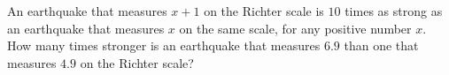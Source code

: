 An earthquake that measures $x+1$ on the Richter scale is $10$ times as strong as an earthquake that measures $x$ on the same scale, for any positive number $x$. How many times stronger is an earthquake that measures $6.9$ than one that measures $4.9$ on the Richter scale?
